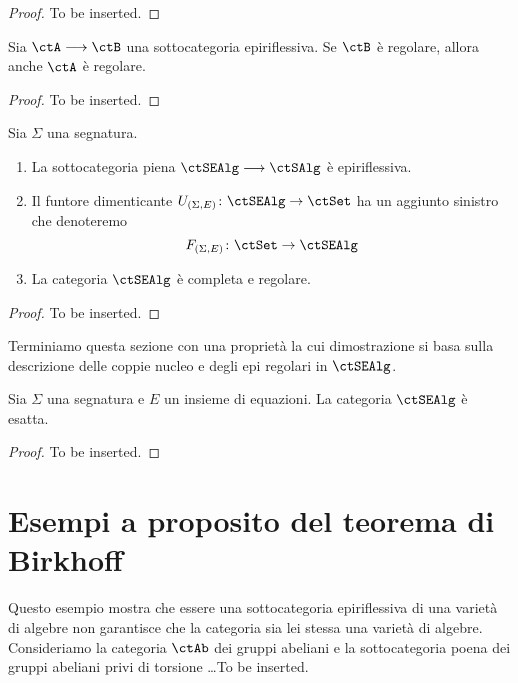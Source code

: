 \begin{proof}
To be inserted.
\end{proof}

\begin{lemma}\label{lemma_epirifl_reg}
Sia $\ctA \fun \ctB$ una sottocategoria epiriflessiva. Se $\ctB$ è regolare, allora anche $\ctA$ è regolare.
\end{lemma}

\begin{proof}
To be inserted.
\end{proof}

\begin{corollary}\label{cor_alg_reg}
Sia $\Sigma$ una segnatura. 
\begin{enumerate}
\item La sottocategoria piena $\ctSEAlg \fun \ctSAlg$ è epiriflessiva.
\item Il funtore dimenticante $U_{(\Sigma,E)} \colon \ctSEAlg \to \ctSet$ ha un aggiunto sinistro che denoteremo
\[
  F_{(\Sigma,E)} \colon \ctSet \to \ctSEAlg 
\]
\item La categoria $\ctSEAlg$ è completa e regolare.
\end{enumerate}
\end{corollary}

\begin{proof}
To be inserted.
\end{proof}

Terminiamo questa sezione con una proprietà la cui dimostrazione si basa sulla descrizione delle coppie nucleo e degli
epi regolari in $\ctSEAlg$.

\begin{proposition}\label{prop_alg_ex}
Sia $\Sigma$ una segnatura e $E$ un insieme di equazioni. La categoria $\ctSEAlg$ è esatta.
\end{proposition}

\begin{proof}
To be inserted.
\end{proof}

\section{Esempi a proposito del teorema di Birkhoff}\label{sec_ex_th_Birkhoff}

\begin{example}\label{esempio_torsionfree}
Questo esempio mostra che essere una sottocategoria epiriflessiva di una varietà di algebre non garantisce che la categoria 
sia lei stessa una varietà di algebre. Consideriamo la categoria $\ctAb$ dei gruppi abeliani e la sottocategoria poena dei gruppi 
abeliani privi di torsione \ldots To be inserted.
\end{example}

